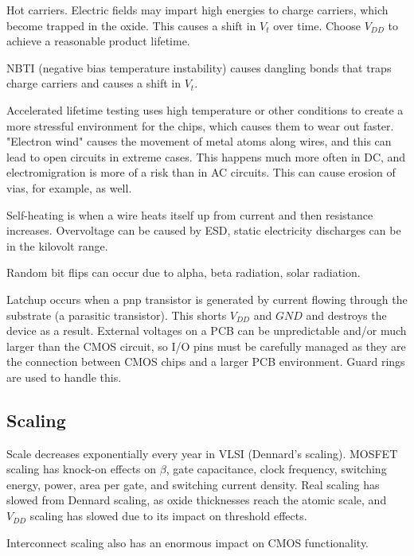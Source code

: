 \documentclass{article}
\begin{document}
Hot carriers. Electric fields may impart high energies to charge carriers, which become trapped in the oxide. This causes a shift in \(V_t\) over time. Choose \(V_{DD}\) to achieve a reasonable product lifetime.

NBTI (negative bias temperature instability) causes dangling bonds that traps charge carriers and causes a shift in \(V_t\). 

Accelerated lifetime testing uses high temperature or other conditions to create a more stressful environment for the chips, which causes them to wear out faster. "Electron wind" causes the movement of metal atoms along wires, and this can lead to open circuits in extreme cases. This happens much more often in DC, and electromigration is more of a risk than in AC circuits. This can cause erosion of vias, for example, as well.

Self-heating is when a wire heats itself up from current and then resistance increases. Overvoltage can be caused by ESD, static electricity discharges can be in the kilovolt range. 

Random bit flips can occur due to alpha, beta radiation, solar radiation.

Latchup occurs when a pnp transistor is generated by current flowing through the substrate (a parasitic transistor). This shorts \(V_{DD}\) and \(GND\) and destroys the device as a result. External voltages on a PCB can be unpredictable and/or much larger than the CMOS circuit, so I/O pins must be carefully managed as they are the connection between CMOS chips and a larger PCB environment. Guard rings are used to handle this. 

\subsection{Scaling}
Scale decreases exponentially every year in VLSI (Dennard's scaling). MOSFET scaling has knock-on effects on \(\beta\), gate capacitance, clock frequency, switching energy, power, area per gate, and switching current density. Real scaling has slowed from Dennard scaling, as oxide thicknesses reach the atomic scale, and \(V_{DD}\) scaling has slowed due to its impact on threshold effects.

Interconnect scaling also has an enormous impact on CMOS functionality.
\end{document}

